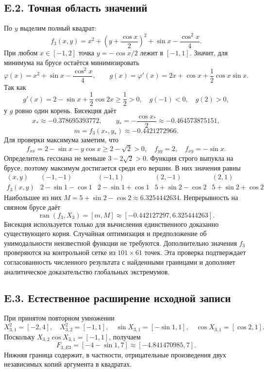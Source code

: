 \documentclass[12pt,a4paper]{article}
\newcommand{\ran}{\operatorname{ran}}
\begin{document}
\subsection*{E.2. Точная область значений}
По $y$ выделим полный квадрат:
\begin{equation}\label{eq:complete}
f_3(x,y)=x^2+\left(y+\frac{\cos x}{2}\right)^2
+\sin x-\frac{\cos^2x}{4}.
\end{equation}
При любом $x\in[-1,2]$ точка $y=-\cos x/2$ лежит в $[-1,1]$.
Значит, для минимума на брусе остаётся минимизировать
\[
\varphi(x)=x^2+\sin x-\frac{\cos^2x}{4},\qquad
g(x)=\varphi'(x)=2x+\cos x+\frac12\cos x\sin x.
\]
Так как
\[
g'(x)=2-\sin x+\frac12\cos2x\geq\frac12>0,
\quad g(-1)<0,\quad g(2)>0,
\]
у $g$ ровно один корень. Бисекция даёт
\[
x_*\approx-0.378695393772,\qquad
y_*=-\frac{\cos x_*}{2}\approx-0.464573875151,
\]
\[
m=f_3(x_*,y_*)\approx-0.4421272966.
\]
Для проверки максимума заметим, что
\[
f_{xx}=2-\sin x-y\cos x\geq2-\sqrt2>0,
\quad f_{yy}=2,\quad f_{xy}=-\sin x.
\]
Определитель гессиана не меньше $3-2\sqrt2>0$.
Функция строго выпукла на брусе, поэтому максимум достигается
среди его вершин. В них значения равны
\[
\begin{array}{c|cccc}
(x,y)&(-1,-1)&(-1,1)&(2,-1)&(2,1)\\\hline
f_3(x,y)&2-\sin1-\cos1&2-\sin1+\cos1&
5+\sin2-\cos2&5+\sin2+\cos2
\end{array}
\]
Наибольшее из них $M=5+\sin2-\cos2\approx6.3254442634$.
Непрерывность на связном брусе даёт
\begin{equation}\label{eq:range3}
\boxed{\ran(f_3,X_3)=[m,M]\approx[-0.442127297,6.325444263]}.
\end{equation}
Бисекция используется только для вычисления единственного доказанно
существующего корня. Случайная оптимизация и предположение об
унимодальности неизвестной функции не требуются.
Дополнительно значения $f_3$ проверяются на контрольной сетке
из $101\times61$ точек. Эта проверка подтверждает согласованность
численного результата с найденными границами и дополняет
аналитическое доказательство глобальных экстремумов.

\subsection*{E.3. Естественное расширение исходной записи}
При принятом повторном умножении
\[
X_{3,1}^2=[-2,4],\quad X_{3,2}^2=[-1,1],\quad
\sin X_{3,1}=[-\sin1,1],\quad
\cos X_{3,1}=[\cos2,1].
\]
Поскольку $X_{3,2}\cos X_{3,1}=[-1,1]$, получаем
\begin{equation}\label{eq:nat3}
F_{3,E3}=[-4-\sin1,7]\approx[-4.841470985,7].
\end{equation}
Нижняя граница содержит, в частности, отрицательные произведения
двух независимых копий аргумента в квадратах.
\end{document}
